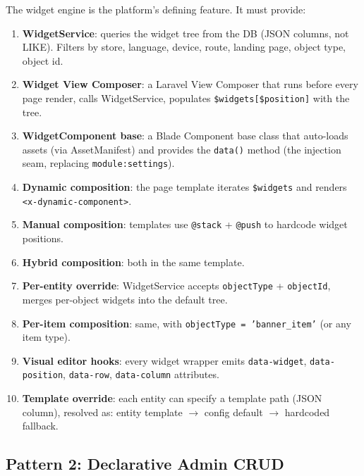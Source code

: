\documentclass[11pt,a4paper]{article}
\begin{document}
\begin{preservebox}
The widget engine is the platform's defining feature. It must provide:

\begin{enumerate}[leftmargin=1.6em,itemsep=2pt]
  \item \textbf{WidgetService}: queries the widget tree from the DB
        (JSON columns, not LIKE). Filters by store, language, device,
        route, landing page, object type, object id.
  \item \textbf{Widget View Composer}: a Laravel View Composer that
        runs before every page render, calls WidgetService, populates
        \texttt{\$widgets[\$position]} with the tree.
  \item \textbf{WidgetComponent base}: a Blade Component base class
        that auto-loads assets (via AssetManifest) and provides the
        \texttt{data()} method (the injection seam, replacing
        \texttt{module:settings}).
  \item \textbf{Dynamic composition}: the page template iterates
        \texttt{\$widgets} and renders \texttt{<x-dynamic-component>}.
  \item \textbf{Manual composition}: templates use \texttt{@stack} +
        \texttt{@push} to hardcode widget positions.
  \item \textbf{Hybrid composition}: both in the same template.
  \item \textbf{Per-entity override}: WidgetService accepts
        \texttt{objectType} + \texttt{objectId}, merges per-object
        widgets into the default tree.
  \item \textbf{Per-item composition}: same, with
        \texttt{objectType = 'banner\_item'} (or any item type).
  \item \textbf{Visual editor hooks}: every widget wrapper emits
        \texttt{data-widget}, \texttt{data-position}, \texttt{data-row},
        \texttt{data-column} attributes.
  \item \textbf{Template override}: each entity can specify a template
        path (JSON column), resolved as: entity template $\to$ config
        default $\to$ hardcoded fallback.
\end{enumerate}
\end{preservebox}

\subsection{Pattern 2: Declarative Admin CRUD}
\end{document}
